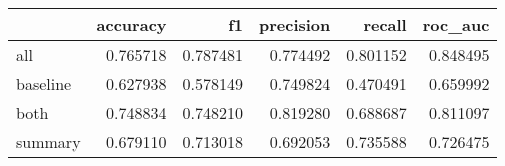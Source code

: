 \begin{tabular}{lrrrrr}
\toprule
{} &  accuracy &        f1 &  precision &    recall &   roc\_auc \\
\midrule
all      &  0.765718 &  0.787481 &   0.774492 &  0.801152 &  0.848495 \\
baseline &  0.627938 &  0.578149 &   0.749824 &  0.470491 &  0.659992 \\
both     &  0.748834 &  0.748210 &   0.819280 &  0.688687 &  0.811097 \\
summary  &  0.679110 &  0.713018 &   0.692053 &  0.735588 &  0.726475 \\
\bottomrule
\end{tabular}
